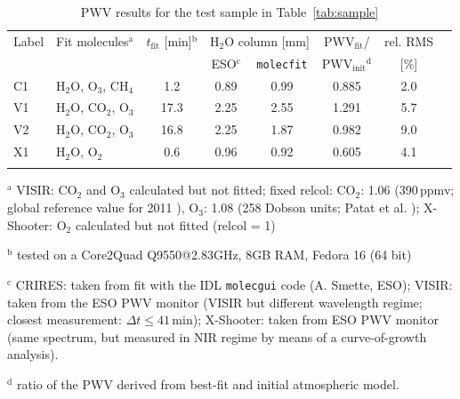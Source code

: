\begin{table}
\caption[]{\ac{PWV} results for the test sample in Table~\ref{tab:sample}}
\label{tab:results}
\centering
\vspace{5pt}
\begin{tabular}{l l c c c c c c}
\hline\hline
\noalign{\smallskip}
Label & Fit molecules$^\mathrm{a}$ & $t_\mathrm{fit}$ [min]$^\mathrm{b}$ &
\multicolumn{2}{c}{H$_2$O column [mm]} & PWV$_\mathrm{fit}$/ & rel. RMS \\
& & & ESO$^\mathrm{c}$ & {\tt molecfit} & PWV$_\mathrm{init}$$^\mathrm{d}$ & [\%] \\
\noalign{\smallskip}
\hline
\noalign{\smallskip}
C1 & H$_2$O, O$_3$, CH$_4$ &  1.2 & 0.89 & 0.99 & 0.885 & 2.0 \\
V1 & H$_2$O, CO$_2$, O$_3$ & 17.3 & 2.25 & 2.55 & 1.291 & 5.7 \\
V2 & H$_2$O, CO$_2$, O$_3$ & 16.8 & 2.25 & 1.87 & 0.982 & 9.0 \\
X1 & H$_2$O, O$_2$         &  0.6 & 0.96 & 0.92 & 0.605 & 4.1 \\
\noalign{\smallskip}
\hline
\end{tabular}
\begin{list}{}{}
\item[$^\mathrm{a}$] VISIR: CO$_2$ and O$_3$ calculated but not fitted; fixed
{\sc relcol}: CO$_2$: 1.06 (390\,ppmv; global reference value for 2011
\cite{CDIAC}), O$_3$: 1.08 (258 Dobson units; Patat et al. \cite{PAT11});
X-Shooter: O$_2$ calculated but not fitted ({\sc relcol} = 1)
\item[$^\mathrm{b}$] tested on a Core2Quad Q9550@2.83GHz, 8GB RAM, Fedora 16
(64 bit)
\item[$^\mathrm{c}$] CRIRES: taken from fit with the IDL {\tt molecgui} code
(A. Smette, ESO); VISIR: taken from the ESO \ac{PWV} monitor (VISIR but
different wavelength regime; closest measurement: $\Delta t \le 41$\,min);
X-Shooter: taken from ESO \ac{PWV} monitor (same spectrum, but measured in NIR
regime by means of a curve-of-growth analysis).
\item[$^\mathrm{d}$] ratio of the \ac{PWV} derived from best-fit and initial
atmospheric model.
\end{list}
\end{table}

